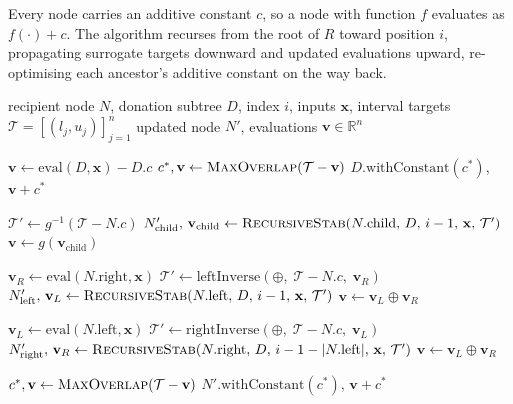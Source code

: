 \documentclass{llncs}
\begin{document}
Every node carries an additive constant $c$, so a node with function $f$ evaluates as $f(\cdot) + c$. The algorithm recurses from the root of $R$ toward position $i$, propagating surrogate targets downward and updated evaluations upward, re-optimising each ancestor's additive constant on the way back. 

\begin{algorithm}
\caption{$\textsc{RecursiveStab}(N, D, i, \mathbf{x}, \mathcal{T})$}
\label{alg:aligned-insert}
\begin{algorithmic}[1]
\Require recipient node $N$, donation subtree $D$, index $i$, inputs $\mathbf{x}$,
         interval targets $\mathcal{T} = [(l_j, u_j)]_{j=1}^{n}$
\Ensure  updated node $N'$, evaluations $\mathbf{v} \in \mathbb{R}^n$

 
  \State $\mathbf{v} \leftarrow \mathrm{eval}(D, \mathbf{x}) - D.c$
  \State $c^*, \mathbf{v} \leftarrow \textsc{MaxOverlap}(\mathcal{T} - \mathbf{v})$
  \State \Return $D.\mathrm{withConstant}(c^*)$,\; $\mathbf{v} + c^*$
\EndIf

  \State $\mathcal{T}' \leftarrow g^{-1}(\mathcal{T} - N.c)$ 
  \State $N'_\mathrm{child},\, \mathbf{v}_\mathrm{child} \leftarrow \textsc{RecursiveStab}(N.\mathrm{child},\, D,\, i-1,\, \mathbf{x},\, \mathcal{T}')$
  \State $\mathbf{v} \leftarrow g(\mathbf{v}_\mathrm{child})$

  \State $\mathbf{v}_R \leftarrow \mathrm{eval}(N.\mathrm{right}, \mathbf{x})$
  \State $\mathcal{T}' \leftarrow \mathrm{leftInverse}(\oplus,\; \mathcal{T} - N.c,\; \mathbf{v}_R)$
  \State $N'_\mathrm{left},\, \mathbf{v}_L \leftarrow \textsc{RecursiveStab}(N.\mathrm{left},\, D,\, i-1,\, \mathbf{x},\, \mathcal{T}')$
  \State $\mathbf{v} \leftarrow \mathbf{v}_L \oplus \mathbf{v}_R$

\Else {}
  \State $\mathbf{v}_L \leftarrow \mathrm{eval}(N.\mathrm{left}, \mathbf{x})$
  \State $\mathcal{T}' \leftarrow \mathrm{rightInverse}(\oplus,\; \mathcal{T} - N.c,\; \mathbf{v}_L)$
  \State $N'_\mathrm{right},\, \mathbf{v}_R \leftarrow \textsc{RecursiveStab}(N.\mathrm{right},\, D,\, i-1-|N.\mathrm{left}|,\, \mathbf{x},\, \mathcal{T}')$
  \State $\mathbf{v} \leftarrow \mathbf{v}_L \oplus \mathbf{v}_R$
\EndIf

\State $c^*, \mathbf{v} \leftarrow \textsc{MaxOverlap}(\mathcal{T} - \mathbf{v})$ 
\State \Return $N'.\mathrm{withConstant}(c^*)$,\; $\mathbf{v} + c^*$
\end{algorithmic}
\end{algorithm}
\end{document}
